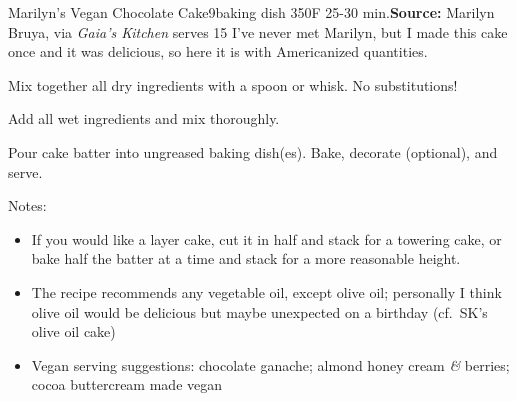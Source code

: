 \begin{recipe}[]{Marilyn's Vegan Chocolate Cake}{9\inch{}\inch baking dish \hfill 350\0F \hfill 25-30 min.}{\textbf{Source:} Marilyn Bruya, via \textit{Gaia's Kitchen} \hfill serves 15}
 \freeform I've never met Marilyn, but I made this cake once and it was delicious, so here it is with Americanized quantities.

 Mix together all dry ingredients with a spoon or whisk. No substitutions!

 Add all wet ingredients and mix thoroughly.

 \newstep Pour cake batter into ungreased baking dish(es). Bake, decorate (optional), and serve.

 \freeform Notes:
 \begin{itemize}
  \item If you would like a layer cake, cut it in half and stack for a towering cake, or bake half the batter at a time and stack for a more reasonable height.
  \item The recipe recommends any vegetable oil, except olive oil; personally I think olive oil would be delicious but maybe unexpected on a birthday (cf.\ SK's olive oil cake)
  \item Vegan serving suggestions: chocolate ganache; almond honey cream \textit{\&} berries; cocoa buttercream made vegan
 \end{itemize}
\end{recipe}
